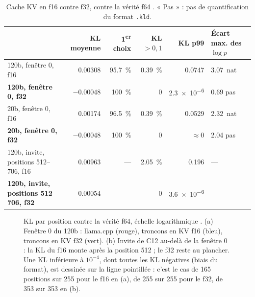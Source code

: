 \begin{table}[ht]
\centering\footnotesize
\caption[Cache KV en f16 contre f32]{Cache KV en f16 contre f32, contre la vérité f64 \mes. « Pas » : pas de quantification du format \texttt{.kld}.}
\label{t2res-tab:kv}
\begin{tabularx}{\linewidth}{@{}>{\raggedright\arraybackslash}Xrrrrl@{}}
\toprule
& KL moyenne & 1\textsuperscript{er} choix & KL $> 0{,}1$ & KL p99 & Écart max. des $\log p$ \\
\midrule
120b, fenêtre 0, f16 & \num{0.00308} & \SI{95.7}{\percent} & \SI{0.39}{\percent} & \num{0.0747} & \SI{3.07}{nat} \\
\textbf{120b, fenêtre 0, f32} & $-\num{0.00048}$ & \SI{100}{\percent} & 0 & \num{2.3e-6} & \num{0.69} pas \\
20b, fenêtre 0, f16 & \num{0.00174} & \SI{96.5}{\percent} & \SI{0.39}{\percent} & \num{0.0529} & \SI{2.32}{nat} \\
\textbf{20b, fenêtre 0, f32} & $-\num{0.00048}$ & \SI{100}{\percent} & 0 & $\approx 0$ & \num{2.04} pas \\
120b, invite, positions 512--706, f16 & \num{0.00963} & --- & \SI{2.05}{\percent} & \num{0.196} & --- \\
\textbf{120b, invite, positions 512--706, f32} & $-\num{0.00054}$ & --- & 0 & \num{3.6e-6} & --- \\
\bottomrule
\end{tabularx}
\end{table}

\begin{figure}[ht]
\centering
\GrapheResKL
\caption[KL par position contre la vérité f64]{KL par position contre la vérité f64, échelle logarithmique \mes. (a) Fenêtre 0 du 120b : llama.cpp (rouge), troncons en KV f16 (bleu), troncons en KV f32 (vert). (b) Invite de C12 au-delà de la fenêtre 0 : la KL du f16 monte après la position 512 ; le f32 reste au plancher. Une KL inférieure à $10^{-4}$, dont toutes les KL négatives (biais du format), est dessinée sur la ligne pointillée : c'est le cas de 165 positions sur 255 pour le f16 en (a), de 255 sur 255 pour le f32, de 353 sur 353 en (b).}
\label{t2res-fig:kl}
\end{figure}

